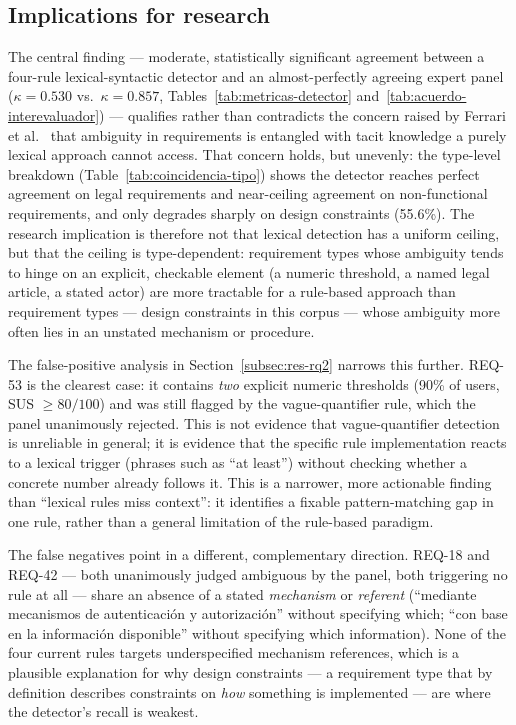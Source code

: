 \documentclass[pdflatex,sn-mathphys-num]{sn-jnl}
\theoremstyle{thmstyleone}%
\theoremstyle{thmstyletwo}%
\theoremstyle{thmstylethree}%
\begin{document}
	\subsection{Implications for research}\label{subsec:disc-research}
	
	The central finding --- moderate, statistically significant agreement between a
	four-rule lexical-syntactic detector and an almost-perfectly agreeing expert
	panel ($\kappa=0.530$ vs.\ $\kappa=0.857$, Tables~\ref{tab:metricas-detector}
	and~\ref{tab:acuerdo-interevaluador}) --- qualifies rather than contradicts the
	concern raised by Ferrari et al.~\cite{ferrari2016} that ambiguity in
	requirements is entangled with tacit knowledge a purely lexical approach cannot
	access. That concern holds, but unevenly: the type-level breakdown
	(Table~\ref{tab:coincidencia-tipo}) shows the detector reaches perfect
	agreement on legal requirements and near-ceiling agreement on non-functional
	requirements, and only degrades sharply on design constraints (55.6\%). The
	research implication is therefore not that lexical detection has a uniform
	ceiling, but that the ceiling is type-dependent: requirement types whose
	ambiguity tends to hinge on an explicit, checkable element (a numeric
	threshold, a named legal article, a stated actor) are more tractable for a
	rule-based approach than requirement types --- design constraints in this
	corpus --- whose ambiguity more often lies in an unstated mechanism or
	procedure.
	
	The false-positive analysis in Section~\ref{subsec:res-rq2} narrows this
	further. REQ-53 is the clearest case: it contains \emph{two} explicit numeric
	thresholds (90\% of users, SUS $\geq 80/100$) and was still flagged by the
	vague-quantifier rule, which the panel unanimously rejected. This is not
	evidence that vague-quantifier detection is unreliable in general; it is
	evidence that the specific rule implementation reacts to a lexical trigger
	(phrases such as ``at least'') without checking whether a concrete number
	already follows it. This is a narrower, more actionable finding than ``lexical
	rules miss context'': it identifies a fixable pattern-matching gap in one rule,
	rather than a general limitation of the rule-based paradigm.
	
	The false negatives point in a different, complementary direction. REQ-18 and
	REQ-42 --- both unanimously judged ambiguous by the panel, both triggering no
	rule at all --- share an absence of a stated \emph{mechanism} or
	\emph{referent} (``mediante mecanismos de autenticación y autorización''
	without specifying which; ``con base en la información disponible'' without
	specifying which information). None of the four current rules targets
	underspecified mechanism references, which is a plausible explanation for why
	design constraints --- a requirement type that by definition describes
	constraints on \emph{how} something is implemented --- are where the detector's
	recall is weakest.
	
\end{document}

